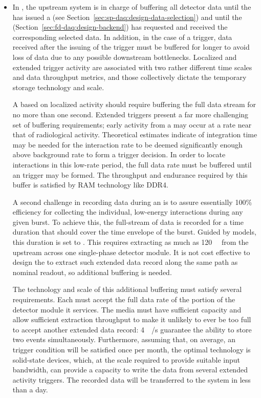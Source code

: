 \begin{itemize}
\item In , the upstream  system is in charge of buffering all
detector data until the  has issued a 
(see Section~\ref{sec:sp-daq:design-data-selection}) and until the
 (Section~\ref{sec:fd-daq:design-backend}) has requested
and received the corresponding selected data. 
In addition, in the case of a  trigger, data received after
the issuing of the trigger must be buffered for longer to
avoid loss of data due to any possible downstream
bottlenecks. Localized and extended trigger activity are associated
with two rather different time scales and data throughput metrics, and
those collectively dictate the temporary storage technology and scale. 

A  based on localized
activity should require buffering the full data stream for no more than one second.
Extended triggers present a far more challenging set of buffering
requirements; 
early activity from a  may occur at a rate near that of radiological activity.
Theoretical estimates indicate \snbpretime of integration time may be needed for the
 interaction rate to be deemed significantly enough above
background rate to form a trigger decision.
In order to locate interactions in this low-rate period, the full data rate must be buffered until an  trigger may be formed.
The throughput and endurance required by this buffer is satisfied by RAM technology like DDR4.

A second challenge in recording data during an  is to assure
essentially 100\% efficiency for collecting the individual, low-energy
interactions during any given  burst. 
To achieve this, the full-stream of data is recorded for a time duration that should cover the time envelope of the burst.
Guided by  models, this duration is set to \snbtime.
This requires extracting as much as \SI{120}{\tera\byte} from the  upstream  across one single-phase detector module.
It is not cost effective to design the  to extract such
extended data record along the same path as nominal readout, so
additional buffering is needed.

The technology and scale of this additional buffering must satisfy several requirements. 
Each  must accept the full data rate of the portion of the detector module it services.
The media must have sufficient capacity and allow sufficient extraction throughput to make it unlikely to ever be too full to accept another extended data record: \SI{4}{\tera\bit/\second} guarantee the ability to store two  events simultaneously.
Furthermore, assuming that, on average, an  trigger condition will be
satisfied once per month, the optimal technology is
solid-state  devices, which, at the scale required to provide suitable input bandwidth, can provide a capacity to write the data from several extended activity triggers. The recorded data will be transferred to the  system in less than a day.


\end{itemize}
